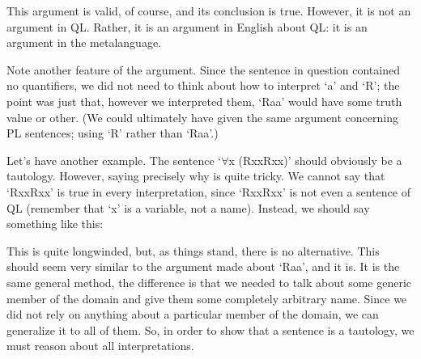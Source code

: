 
This argument is valid, of course, and its conclusion is true. However, it is not an argument in QL. Rather, it is an argument in English about QL: it is an argument in the metalanguage.

Note another feature of the argument. Since the sentence in question contained no quantifiers, we did not need to think about how to interpret ‘a’ and ‘R’; the point was just that, however we interpreted them, ‘Raa’ would have some truth value or other. (We could ultimately have given the same argument concerning PL sentences; using ‘R' rather than ‘Raa'.)

Let’s have another example. The sentence ‘$\forall$x (Rxx\eor \enot Rxx)’ should obviously be a tautology. However, saying precisely why is quite tricky. We cannot say that ‘Rxx\eor \enot Rxx’ is true in every interpretation, since ‘Rxx\eor \enot Rxx’ is not even a sentence of QL (remember that ‘x’ is a variable, not a name). Instead, we should say something like this:

This is quite longwinded, but, as things stand, there is no alternative. This should seem very similar to the argument made about ‘Raa', and it is. It is the same general method, the difference is that we needed to talk about some generic member of the domain and give them some completely arbitrary name. Since we did not rely on anything about a particular member of the domain, we can generalize it to all of them. So, in order to show that a sentence is a tautology, we must reason about all interpretations.


